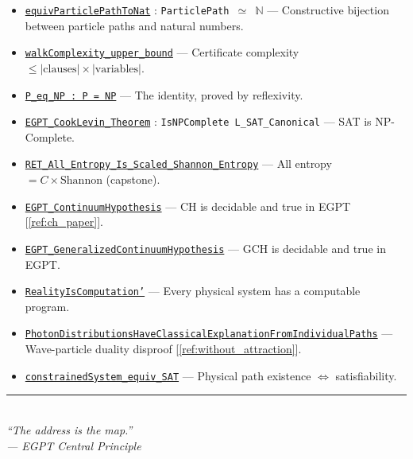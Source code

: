 \documentclass[11pt,a4paper]{article}
\begin{document}
\begin{itemize}
    \item \href{https://eabadir.github.io/EGPT/Lean/EGPT/NumberTheory/Core.lean}{\texttt{equivParticlePathToNat}} : \texttt{ParticlePath $\simeq$ $\mathbb{N}$} --- Constructive bijection between particle paths and natural numbers.
    \item \href{https://eabadir.github.io/EGPT/Lean/EGPT/InformationTheory/Complexity/Tableau.lean}{\texttt{walkComplexity\_upper\_bound}} --- Certificate complexity $\leq |\text{clauses}| \times |\text{variables}|$.
    \item \href{https://eabadir.github.io/EGPT/Lean/EGPT/Complexity/PPNP.lean}{\texttt{P\_eq\_NP : P = NP}} --- The identity, proved by reflexivity.
    \item \href{https://eabadir.github.io/EGPT/Lean/EGPT/Complexity/PPNP.lean}{\texttt{EGPT\_CookLevin\_Theorem}} : \texttt{IsNPComplete L\_SAT\_Canonical} --- SAT is NP-Complete.
    \item \href{https://eabadir.github.io/EGPT/Lean/EGPT/NumberTheory/Analysis.lean}{\texttt{RET\_All\_Entropy\_Is\_Scaled\_Shannon\_Entropy}} --- All entropy $= C \times \text{Shannon}$ (capstone).
    \item \href{https://eabadir.github.io/EGPT/Lean/EGPT/NumberTheory/ContinuumHypothesis.lean}{\texttt{EGPT\_ContinuumHypothesis}} --- CH is decidable and true in EGPT [\ref{ref:ch_paper}].
    \item \href{https://eabadir.github.io/EGPT/Lean/EGPT/NumberTheory/ContinuumHypothesis.lean}{\texttt{EGPT\_GeneralizedContinuumHypothesis}} --- GCH is decidable and true in EGPT.
    \item \href{https://eabadir.github.io/EGPT/Lean/EGPT/Physics/RealityIsComputation.lean}{\texttt{RealityIsComputation'}} --- Every physical system has a computable program.
    \item \href{https://eabadir.github.io/EGPT/Lean/PPNP/Proofs/WaveParticleDualityDisproved.lean}{\texttt{PhotonDistributionsHaveClassicalExplanationFromIndividualPaths}} --- Wave-particle duality disproof [\ref{ref:without_attraction}].
    \item \href{https://eabadir.github.io/EGPT/Lean/EGPT/Complexity/Physics.lean}{\texttt{constrainedSystem\_equiv\_SAT}} --- Physical path existence $\Leftrightarrow$ satisfiability.
\end{itemize}

\vspace{2em}
\begin{center}
\rule{0.5\textwidth}{0.4pt}\\[0.5em]
\small\itshape
``The address is the map.''\\
--- EGPT Central Principle
\end{center}
\end{document}
